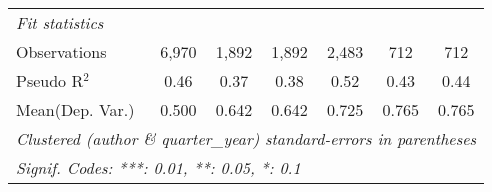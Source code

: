 \begin{tabular}{lcccccc}
   \midrule
   \emph{Fit statistics}\\
   Observations            & 6,970   & 1,892   & 1,892         & 2,483   & 712     & 712\\  
   Pseudo R$^2$            & 0.46    & 0.37    & 0.38          & 0.52    & 0.43    & 0.44\\  
Mean(Dep. Var.) & 0.500 & 0.642 & 0.642 & 0.725 & 0.765 & 0.765 \\
   \midrule \midrule
   \multicolumn{7}{l}{\emph{Clustered (author \& quarter\_year) standard-errors in parentheses}}\\
   \multicolumn{7}{l}{\emph{Signif. Codes: ***: 0.01, **: 0.05, *: 0.1}}\\
\end{tabular}
\par\endgroup
